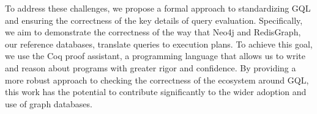 \documentclass[14pt]{constructor-thesis}
\begin{document}


To address these challenges, we propose a formal approach to standardizing GQL and ensuring the correctness of the key details of query evaluation. Specifically, we aim to demonstrate the correctness of the way that Neo4j and RedisGraph, our reference databases, translate queries to execution plans. To achieve this goal, we use the Coq proof assistant, a programming language that allows us to write and reason about programs with greater rigor and confidence. By providing a more robust approach to checking the correctness of the ecosystem around GQL, this work has the potential to contribute significantly to the wider adoption and use of graph databases.



\end{document}
